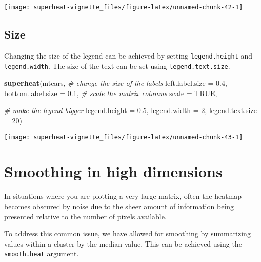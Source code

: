 \documentclass[]{book}
\newenvironment{Shaded}{\begin{snugshade}}{\end{snugshade}}
\newcommand{\KeywordTok}[1]{\textcolor[rgb]{0.13,0.29,0.53}{\textbf{{#1}}}}
\newcommand{\DataTypeTok}[1]{\textcolor[rgb]{0.13,0.29,0.53}{{#1}}}
\newcommand{\DecValTok}[1]{\textcolor[rgb]{0.00,0.00,0.81}{{#1}}}
\newcommand{\FloatTok}[1]{\textcolor[rgb]{0.00,0.00,0.81}{{#1}}}
\newcommand{\CommentTok}[1]{\textcolor[rgb]{0.56,0.35,0.01}{\textit{{#1}}}}
\newcommand{\OtherTok}[1]{\textcolor[rgb]{0.56,0.35,0.01}{{#1}}}
\newcommand{\NormalTok}[1]{{#1}}
\theoremstyle{definition}
\theoremstyle{definition}
\theoremstyle{remark}
\begin{document}
\begin{center}\texttt{[image: superheat-vignette\_files/figure-latex/unnamed-chunk-42-1]} \end{center}

\section{Size}\label{size-3}

Changing the size of the legend can be achieved by setting
\texttt{legend.height} and \texttt{legend.width}. The size of the text
can be set using \texttt{legend.text.size}.

\begin{Shaded}
\begin{Highlighting}[]
\KeywordTok{superheat}\NormalTok{(mtcars,}
          \CommentTok{# change the size of the labels}
          \DataTypeTok{left.label.size =} \FloatTok{0.4}\NormalTok{,}
          \DataTypeTok{bottom.label.size =} \FloatTok{0.1}\NormalTok{,}
          \CommentTok{# scale the matrix columns}
          \DataTypeTok{scale =} \OtherTok{TRUE}\NormalTok{,}
          
          \CommentTok{# make the legend bigger}
          \DataTypeTok{legend.height =} \FloatTok{0.5}\NormalTok{,}
          \DataTypeTok{legend.width =} \DecValTok{2}\NormalTok{,}
          \DataTypeTok{legend.text.size =} \DecValTok{20}\NormalTok{)}
\end{Highlighting}
\end{Shaded}

\begin{center}\texttt{[image: superheat-vignette\_files/figure-latex/unnamed-chunk-43-1]} \end{center}

\chapter{Smoothing in high
dimensions}\label{smoothing-in-high-dimensions}

In situations where you are plotting a very large matrix, often the
heatmap becomes obscured by noise due to the sheer amount of information
being presented relative to the number of pixels available.

To address this common issue, we have allowed for smoothing by
summarizing values within a cluster by the median value. This can be
achieved using the \texttt{smooth.heat} argument.
\end{document}
